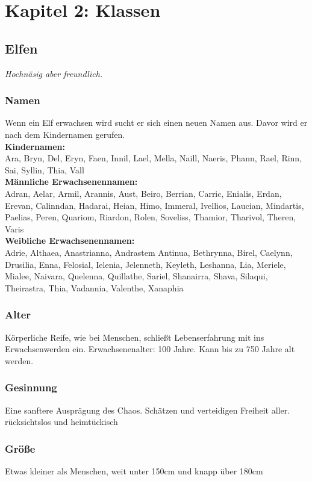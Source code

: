 \chapter{Kapitel 2: Klassen}
\section{Elfen}
\textit{Hochnäsig aber freundlich.}

\subsection*{Namen}
Wenn ein Elf erwachsen wird sucht er sich einen neuen Namen aus. Davor wird er nach dem Kindernamen gerufen.\\
\textbf{Kindernamen:}\\
Ara, Bryn, Del, Eryn, Faen, Innil, Lael, Mella, Naill, Naeris, Phann, Rael, Rinn, Sai, Syllin, Thia, Vall\\
\textbf{Männliche Erwachsenennamen:}\\
Adran, Aelar, Armil, Arannis, Aust, Beiro, Berrian, Carric, Enialis, Erdan, Erevan, Calinndan, Hadarai, Heian, Himo, Immeral, Ivellios, Laucian, Mindartis, Paelias, Peren, Quariom, Riardon, Rolen, Soveliss, Thamior, Tharivol, Theren, Varis\\
\textbf{Weibliche Erwachsenennamen:}\\
Adrie, Althaea, Anastrianna, Andrastem Antinua, Bethrynna, Birel, Caelynn, Drusilia, Enna, Felosial, Ielenia, Jelenneth, Keyleth, Leshanna, Lia, Meriele, Mialee, Naivara, Quelenna, Quillathe, Sariel, Shanairra, Shava, Silaqui, Theirastra, Thia, Vadannia, Valenthe, Xanaphia

\subsection*{Alter}
Körperliche Reife, wie bei Menschen, schließt Lebenserfahrung mit ins Erwachsenwerden ein. Erwachsenenalter: 100 Jahre. Kann bis zu 750 Jahre alt werden.

\subsection*{Gesinnung}
Eine sanftere Ausprägung des Chaos. Schätzen und verteidigen Freiheit aller. rücksichtslos und heimtückisch

\subsection*{Größe}
Etwas kleiner als Menschen, weit unter 150cm und knapp über 180cm

